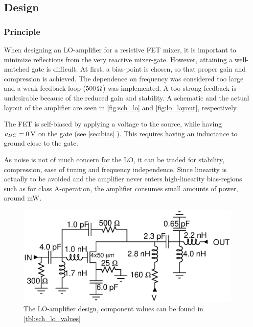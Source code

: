 		\subsection{Design}
			\subsubsection{Principle}
				When designing an LO-amplifier for a resistive FET mixer, it is important to minimize reflections from the very reactive mixer-gate. However, attaining a well-matched gate is difficult.\autocite{yhland1999} At first, a bias-point is chosen, so that proper gain and compression is achieved. The dependence on frequency was considered too large and a weak feedback loop ($\unit[500]{\Omega}$) was implemented. A too strong feedback is undesirable because of the reduced gain and stability. A schematic and the actual layout of the amplifier are seen in \autoref{fig:sch_lo} and \autoref{fig:lo_layout}, respectively.


	The FET is self-biased by applying a voltage to the source, while having $v_{DC}=\unit[0]{V}$ on the gate (see \ref{sec:bias} ). This requires having an inductance to ground close to the gate.


			As noise is not of much concern for the LO, it can be traded for stability, compression, ease of tuning and frequency independence. Since linearity is actually to be avoided and the amplifier never enters high-linearity bias-regions such as for class A-operation, the amplifier consumes small amounts of power, around \unit[100]{mW}.




			\begin{figure}[hbt!]
				\centering
				\includegraphics[width=1.0\textwidth]{fig/amplifiers/lo/sch_lo}
				\caption[LO-amplifier schematic]{The LO-amplifier design, component values can be found in \autoref{tbl:sch_lo_values}}\label{fig:sch_lo}
			\end{figure}



